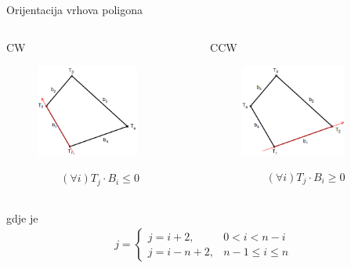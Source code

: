 \documentclass[9pt]{beamer}
\begin{document}
\begin{frame}{Orijentacija vrhova poligona}
\begin{columns}
	\begin{column}[t]{0.5\textwidth}
		CW
	\begin{figure}
			\centering
			\includegraphics[width=0.8\textwidth]{slike/poligon_cw.png}
	\end{figure}
	\begin{align*}
		(\forall i) T_j \cdot B_i \leq 0 
	\end{align*}
	\end{column}
\begin{column}[t]{0.5\textwidth}
	CCW
	\begin{figure}
		\centering		
		\includegraphics[width=0.8\textwidth]{slike/poligon_ccw.png}
	\end{figure}
	\begin{align*}
	(\forall i) T_j \cdot B_i \geq 0 
	\end{align*}
\end{column}
\end{columns}
gdje je 
\begin{align*}
j = \left\{ \begin{array}{cc}
j = i+2, & 0 < i < n-i \\
j = i-n +2, & n-1 \leq i \leq n 
\end{array}
\right.
\end{align*}
\end{frame}
\end{document}

